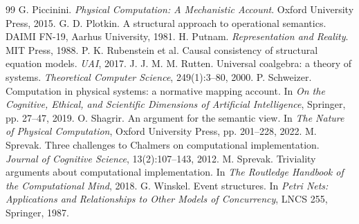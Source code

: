 \documentclass[11pt,a4paper]{article}
\begin{document}
\begin{thebibliography}{99}
 G. Piccinini. \emph{Physical Computation: A Mechanistic Account}. Oxford University Press, 2015.
 G. D. Plotkin. A structural approach to operational semantics. DAIMI FN-19, Aarhus University, 1981.
 H. Putnam. \emph{Representation and Reality}. MIT Press, 1988.
 P. K. Rubenstein et al. Causal consistency of structural equation models. \emph{UAI}, 2017.
 J. J. M. M. Rutten. Universal coalgebra: a theory of systems. \emph{Theoretical Computer Science}, 249(1):3--80, 2000.
 P. Schweizer. Computation in physical systems: a normative mapping account. In \emph{On the Cognitive, Ethical, and Scientific Dimensions of Artificial Intelligence}, Springer, pp. 27--47, 2019.
 O. Shagrir. An argument for the semantic view. In \emph{The Nature of Physical Computation}, Oxford University Press, pp. 201--228, 2022.
 M. Sprevak. Three challenges to Chalmers on computational implementation. \emph{Journal of Cognitive Science}, 13(2):107--143, 2012.
 M. Sprevak. Triviality arguments about computational implementation. In \emph{The Routledge Handbook of the Computational Mind}, 2018.
 G. Winskel. Event structures. In \emph{Petri Nets: Applications and Relationships to Other Models of Concurrency}, LNCS 255, Springer, 1987.
\end{thebibliography}
\end{document}
